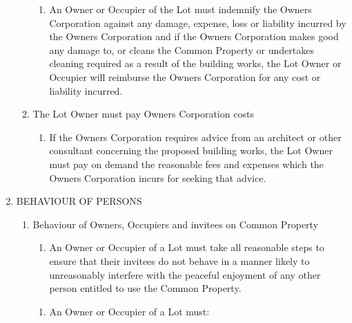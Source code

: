 \documentclass{article}
\begin{document}
\begin{enumerate}[label=\arabic*.]
\begin{enumerate}[label=\arabic{enumi}.\arabic*.]
\begin{enumerate}[label=(\arabic*)]
\item  An Owner or Occupier of the Lot must indemnify the Owners Corporation against any damage, expense, loss or liability incurred by the Owners Corporation and if the Owners Corporation makes good any damage to, or cleans the Common Property or undertakes cleaning required as a result of the building works, the Lot Owner or Occupier will reimburse the Owners Corporation for any cost or liability incurred.

\end{enumerate}

\item  The Lot Owner must pay Owners Corporation costs

\begin{enumerate}[label=(\arabic*)]

\item  If the Owners Corporation requires advice from an architect or other consultant concerning the proposed building works, the Lot Owner must pay on demand the reasonable fees and expenses which the Owners Corporation incurs for seeking that advice.

\end{enumerate}

\end{enumerate}

\item  BEHAVIOUR OF PERSONS

\begin{enumerate}[label=\arabic{enumi}.\arabic*.]

\item  Behaviour of Owners, Occupiers and invitees on Common Property

\begin{enumerate}[label=(\arabic*)]

\item  An Owner or Occupier of a Lot must take all reasonable steps to ensure that their invitees do not behave in a manner likely to unreasonably interfere with the peaceful enjoyment of any other person entitled to use the Common Property.

\newpage


\end{enumerate}

\begin{enumerate}[label=(\arabic*)]

\item  An Owner or Occupier of a Lot must:

\begin{enumerate}[label=(\alph*)]


\end{enumerate}
\end{enumerate}
\end{enumerate}
\end{enumerate}
\end{document}
